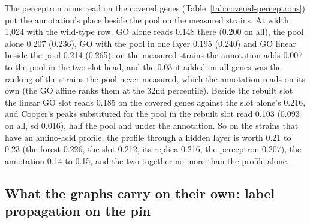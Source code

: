 The perceptron arms read on the covered genes (Table~\ref{tab:covered-perceptrons})
put the annotation's place beside the pool on the measured strains. At width 1,024 with
the wild-type row, GO alone reads 0.148 there (0.200 on all), the pool alone 0.207
(0.236), GO with the pool in one layer 0.195 (0.240) and GO linear beside the pool
0.214 (0.265): on the measured strains the annotation adds 0.007 to the pool in the
two-slot head, and the 0.03 it added on all genes was the ranking of the strains the
pool never measured, which the annotation reads on its own (the GO affine ranks them
at the 32nd percentile). Beside the rebuilt slot the linear GO slot reads 0.185 on the
covered genes against the slot alone's 0.216, and Cooper's peaks substituted for the
pool in the rebuilt slot read 0.103 (0.093 on all, sd 0.016), half the pool and under
the annotation. So on the strains that have an amino-acid profile, the profile through
a hidden layer is worth 0.21 to 0.23 (the forest 0.226, the slot 0.212, its replica
0.216, the perceptron 0.207), the annotation 0.14 to 0.15, and the two together no more
than the profile alone.













\subsection{What the graphs carry on their own: label propagation on the pin}
\label{sec:homophily}


